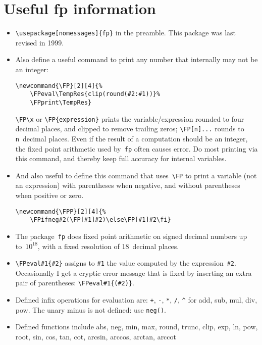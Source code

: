 \documentclass[11pt,a4paper]{article}
\newcommand{\FP}[2][4]{\FPeval\TempRes{clip(round(#2:#1))}\FPprint\TempRes}
\newcommand{\FPP}[2][4]{\FPifneg#2(\FP[#1]#2)\else\FP[#1]#2\fi}
\begin{document}
\section{Useful fp information}
\begin{itemize}
\item \verb|\usepackage[nomessages]{fp}| in the preamble.
This package was last revised in 1999.

\item Also define a useful command to print any number that internally may not be an integer:
\begin{verbatim}
\newcommand{\FP}[2][4]{%
    \FPeval\TempRes{clip(round(#2:#1))}%
    \FPprint\TempRes}
\end{verbatim}
\verb|\FP\x| or \verb|\FP{expression}| prints the variable\slash expression rounded to four decimal places, and clipped to remove trailing zeros;  \verb|\FP[n]...| rounds to \verb|n|~decimal places.
Even if the result of a computation should be an integer, the fixed point arithmetic used by~\verb|fp| often causes error.
Do most printing via this command, and thereby keep full accuracy for internal variables.

\item And also useful to define this command that uses~\verb|\FP| to print a variable (not an expression) with parentheses when negative, and without parentheses when positive or zero.
\begin{verbatim}
\newcommand{\FPP}[2][4]{%
    \FPifneg#2(\FP[#1]#2)\else\FP[#1]#2\fi}
\end{verbatim}


\item The package~\verb|fp| does fixed point arithmetic on signed decimal numbers up to~\(10^{18}\), with a fixed resolution of 18~decimal places.



\item \verb|\FPeval#1{#2}| assigns to \verb|#1| the value computed by the expression~\verb|#2|.  
Occasionally I get a cryptic error message that is fixed by inserting an extra pair of parentheses: \verb|\FPeval#1{(#2)}|.

\item Defined infix operations for evaluation are: \verb|+|, \verb|-|, \verb|*|, \verb|/|, \verb|^| for add, sub, mul, div, pow.
The unary minus is not defined: use \verb|neg()|.

\item Defined functions include abs, neg, min, max, 
	   round, trunc, clip, exp, ln, pow, root, sin, cos, 
	   tan, cot, arcsin, arccos, arctan, arccot 
	   

\end{itemize}
\end{document}
